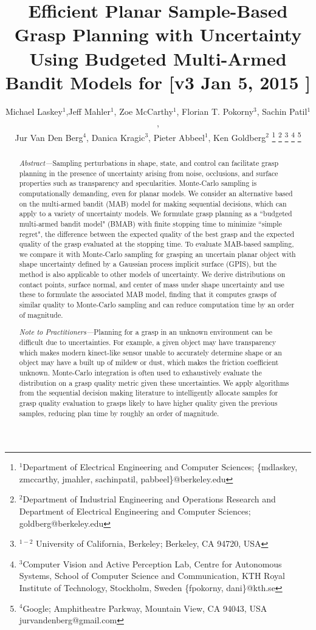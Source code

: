 \documentclass[journal,transmag]{IEEEtran}%
\title{\LARGE \bf
Efficient Planar Sample-Based Grasp Planning with Uncertainty Using Budgeted Multi-Armed Bandit Models for  [v3 Jan 5, 2015 ] }
\author{Michael Laskey$^1$,Jeff Mahler$^1$, Zoe McCarthy$^1$,  Florian T. Pokorny$^3$, Sachin Patil$^1$,\\ Jur Van Den Berg$^4$,  Danica Kragic$^3$, Pieter Abbeel$^1$, Ken Goldberg$^2$%
\thanks{$^1$Department of Electrical Engineering and Computer Sciences; {\small \{mdlaskey, zmccarthy, jmahler, sachinpatil, pabbeel\}@berkeley.edu}}%
\thanks{$^2$Department of Industrial Engineering and Operations Research and Department of Electrical Engineering and Computer Sciences; {\small goldberg@berkeley.edu}}%
\thanks{$^{1-2}$ University of California, Berkeley;  Berkeley, CA 94720, USA}%
\thanks{$^3$Computer Vision and Active Perception Lab, Centre for Autonomous Systems, School of Computer Science and Communication, KTH Royal Institute of Technology, Stockholm, Sweden {\small \{fpokorny, dani\}@kth.se}}%
\thanks{$^4$Google; Amphitheatre Parkway, Mountain View, CA 94043, USA {\small jurvandenberg@gmail.com}}%
}
\begin{document}
\maketitle
\thispagestyle{empty}
\pagestyle{empty}



\begin{abstract}
\textit{Abstract---}Sampling perturbations in shape, state, and control can facilitate grasp planning in the presence of uncertainty arising from noise, occlusions, and surface properties such as transparency and specularities.  Monte-Carlo sampling is computationally demanding, even for planar models. We consider an alternative based on the multi-armed bandit (MAB) model for making sequential decisions, which can apply to a variety of uncertainty models.  We formulate grasp planning as a ``budgeted multi-armed bandit model" (BMAB) with finite stopping time to minimize ``simple regret", the difference between the expected quality of the best grasp and the expected quality of the grasp evaluated at the stopping time.  To evaluate MAB-based sampling, we compare it with Monte-Carlo sampling for grasping an uncertain planar object with shape uncertainty defined by a Gaussian process implicit surface (GPIS), but the method is also applicable to other models of uncertainty.  We derive distributions on contact points, surface normal, and center of mass under shape uncertainty and use these to formulate the associated MAB model, finding that it computes grasps of similar quality to Monte-Carlo sampling and can reduce computation time by an order of magnitude.
\end{abstract}

\begin{abstract}
\textit{Note to Practitioners---}Planning for a grasp in an unknown environment can be difficult due to uncertainties. For example, a given object may have transparency which makes modern kinect-like sensor unable to accurately determine shape or an object may have a built up of mildew or dust, which makes the friction coefficient unknown. Monte-Carlo integration is often used to exhaustively evaluate the distribution on a grasp quality metric given these uncertainties. We apply algorithms from the sequential decision making literature to intelligently allocate samples for grasp quality evaluation to grasps likely to have higher quality given the previous samples, reducing plan time by roughly an order of magnitude.
\end{abstract}
\end{document}
